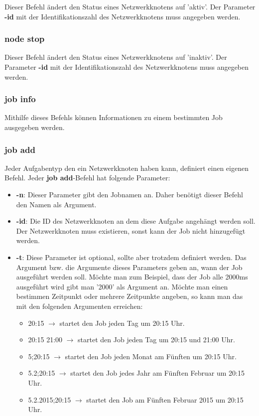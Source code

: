 \documentclass[12pt,a4paper]{report}
\begin{document}
\begin{onehalfspace}
Dieser Befehl ändert den Status eines Netzwerkknotens auf 'aktiv'. Der Parameter \textbf{-id} mit der Identifikationszahl des Netzwerkknotens muss angegeben werden.

\subsubsection{node stop}

Dieser Befehl ändert den Status eines Netzwerkknotens auf 'inaktiv'. Der Parameter \textbf{-id} mit der Identifikationszahl des Netzwerkknotens muss angegeben werden.

\subsubsection{job info}

Mithilfe dieses Befehls können Informationen zu einem bestimmten Job ausgegeben werden.

\subsubsection{job add}

Jeder Aufgabentyp den ein Netzwerkknoten haben kann, definiert einen eigenen Befehl. Jeder \textbf{job add}-Befehl hat folgende Parameter:

\begin{itemize}
\item \textbf{-n}: Dieser Parameter gibt den Jobnamen an. Daher benötigt dieser Befehl den Namen als Argument.
\item \textbf{-id}: Die ID des Netzwerkknoten an dem diese Aufgabe angehängt werden soll. Der Netzwerkknoten muss existieren, sonst kann der Job nicht hinzugefügt werden.
\item \textbf{-t}: Diese Parameter ist optional, sollte aber trotzdem definiert werden. Das Argument bzw. die Argumente dieses Parameters geben an, wann der Job ausgeführt werden soll. Möchte man zum Beispiel, dass der Job alle 2000ms ausgeführt wird gibt man '2000' als Argument an. Möchte man einen bestimmen Zeitpunkt oder mehrere Zeitpunkte angeben, so kann man das mit den folgenden Argumenten erreichen:
  \begin{itemize}
  \item 20:15 $\rightarrow$ startet den Job jeden Tag um 20:15 Uhr.
  \item 20:15 21:00 $\rightarrow$ startet den Job jeden Tag um 20:15 und 21:00 Uhr.
  \item 5;20:15 $\rightarrow$ startet den Job jeden Monat am Fünften um 20:15 Uhr.
  \item 5.2;20:15 $\rightarrow$ startet den Job jedes Jahr am Fünften Februar um 20:15 Uhr.
  \item 5.2.2015;20:15 $\rightarrow$ startet den Job am Fünften Februar 2015 um 20:15 Uhr.
  \end{itemize}
\end{itemize}


\end{onehalfspace}
\end{document}
